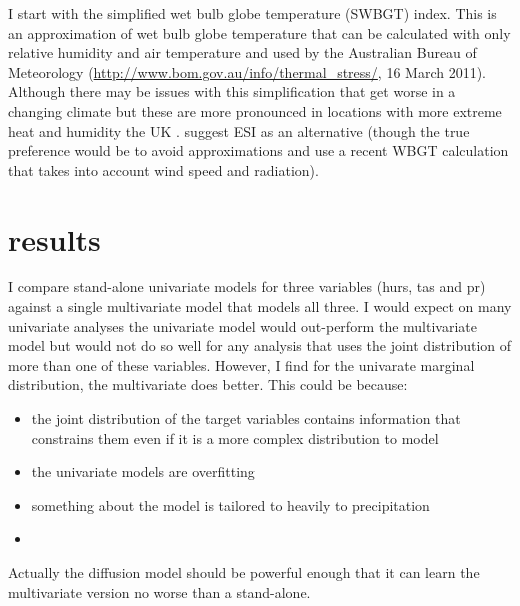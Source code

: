 I start with the simplified wet bulb globe temperature (SWBGT) index. This is an approximation of wet bulb globe temperature that can be calculated with only relative humidity and air temperature \parencite[e.g][]{Blazejczyk2012UTCIcomparison, zhao2015heatstresscmip5, buzan2015heatstress} and used by the Australian Bureau of Meteorology (\url{http://www.bom.gov.au/info/thermal_stress/}, 16 March 2011).
Although there may be issues with this simplification \parencite{kong2022wbgtapproxissues} that get worse in a changing climate but these are more pronounced in locations with more extreme heat and humidity the UK \parencite{qiu2024swbgtbias}. \textcite{kong2022wbgtapproxissues} suggest ESI as an alternative (though the true preference would be to avoid approximations and use a recent WBGT calculation that takes into account wind speed and radiation).


\section{results}
\label{mv:results}

I compare stand-alone univariate models for three variables (hurs, tas and pr) against a single multivariate model that models all three. I would expect on many univariate analyses the univariate model would out-perform the multivariate model but would not do so well for any analysis that uses the joint distribution of more than one of these variables.
However, I find for the univarate marginal distribution, the multivariate does better.
This could be because:
\begin{itemize}
    \item the joint distribution of the target variables contains information that constrains them even if it is a more complex distribution to model
    \item the univariate models are overfitting
    \item something about the model is tailored to heavily to precipitation
    \item
\end{itemize}

Actually the diffusion model should be powerful enough that it can learn the multivariate version no worse than a stand-alone.